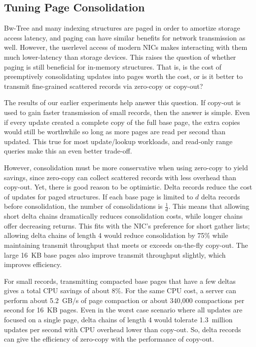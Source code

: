 
\subsection{Tuning Page Consolidation}
\label{sec:consolidation}


Bw-Tree and many indexing structures are paged in order to amortize storage
access latency, and paging can have similar benefits for network transmission
as well. However, the userlevel access of modern NICs makes interacting with
them much lower-latency than storage devices. This raises the question of
whether paging is still beneficial for in-memory structures. That is, is the
cost of preemptively consolidating updates into pages worth the cost, or is it
better to transmit fine-grained scattered records via zero-copy or copy-out?

%





The results of our earlier experiments help answer this question.  If copy-out
is used to gain faster transmission of small records, then the answer is
simple. Even if every update created a complete copy of the full base page, the
extra copies would still be worthwhile so long as more pages are read per
second than updated. This true for most update/lookup workloads, and read-only
range queries make this an even better trade-off.

However, consolidation must be more conservative when using zero-copy to yield
savings, since zero-copy can collect scattered records with less overhead than
copy-out. Yet, there is good reason to be optimistic.  Delta records
reduce the cost of updates for paged structures. If each base page is limited
to $d$ delta records before consolidation, the number of consolidations is
$\frac{1}{d}$. This means that allowing short delta chains dramatically reduces
consolidation costs, while longer chains offer decreasing returns. This fits with
the NIC's preference for short gather lists; allowing delta chains of length 4
would reduce consolidation by 75\% while maintaining transmit throughput that
meets or exceeds on-the-fly copy-out.  The large 16~KB base pages also
improve transmit throughput slightly, which improves efficiency.

For small records, transmitting compacted base pages that have a few deltas gives
a total CPU savings of about 8\%. For the same CPU cost, a server can perform
about 5.2~GB/s of page compaction or about 340,000 compactions per second for
16~KB pages. Even in the worst case scenario where all updates are focused on a
single page, delta chains of length 4 would tolerate 1.3~million updates per
second with CPU overhead lower than copy-out. So, delta records can give the
efficiency of zero-copy with the performance of copy-out.


